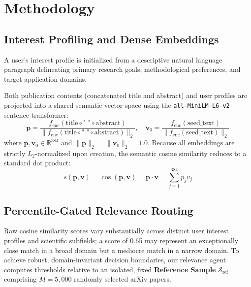 \section{Methodology}
\label{sec:methodology}

\subsection{Interest Profiling and Dense Embeddings}
\label{sec:embeddings}

A user's interest profile is initialized from a descriptive natural language paragraph delineating primary research goals, methodological preferences, and target application domains.

Both publication contents (concatenated title and abstract) and user profiles are projected into a shared semantic vector space using the \texttt{all-MiniLM-L6-v2} sentence transformer:
\begin{equation}
\mathbf{p} = \frac{f_{\text{enc}}(\text{title} \circ \text{" "} \circ \text{abstract})}{\|f_{\text{enc}}(\text{title} \circ \text{" "} \circ \text{abstract})\|_2}, \quad \mathbf{v}_0 = \frac{f_{\text{enc}}(\text{seed\_text})}{\|f_{\text{enc}}(\text{seed\_text})\|_2}
\end{equation}
where $\mathbf{p}, \mathbf{v}_0 \in \mathbb{R}^{384}$ and $\|\mathbf{p}\|_2 = \|\mathbf{v}_0\|_2 = 1.0$. Because all embeddings are strictly $L_2$-normalized upon creation, the semantic cosine similarity reduces to a standard dot product:
\begin{equation}
s(\mathbf{p}, \mathbf{v}) = \cos(\mathbf{p}, \mathbf{v}) = \mathbf{p} \cdot \mathbf{v} = \sum_{j=1}^{384} p_j v_j
\end{equation}

\subsection{Percentile-Gated Relevance Routing}
\label{sec:gating}

Raw cosine similarity scores vary substantially across distinct user interest profiles and scientific subfields; a score of 0.65 may represent an exceptionally close match in a broad domain but a mediocre match in a narrow domain. To achieve robust, domain-invariant decision boundaries, our relevance agent computes thresholds relative to an isolated, fixed \textbf{Reference Sample} $\mathcal{S}_{\text{ref}}$ comprising $M = 5,000$ randomly selected arXiv papers.

